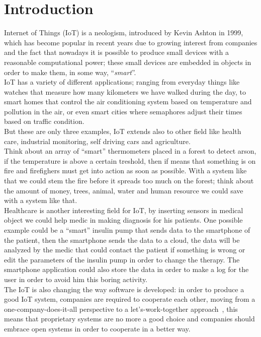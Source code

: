 	\chapter{Introduction}
	Internet of Things (IoT) is a neologism, introduced by Kevin Ashton in 1999, which has become popular in recent years due to
	growing interest from companies and the fact that nowadays it is possible to produce small devices with a reasonable computational power;
	these small devices are embedded in objects in order to make them, in some way, ``\emph{smart}''.\\
	
	IoT has a variety of different applications; ranging from everyday things like watches that measure how many kilometers we have walked during the day, to smart homes that control the air conditioning system based on temperature and pollution in the air, or even smart cities where semaphores adjust their times based on traffic condition.\\
	But these are only three examples, IoT extends also to other field like health care, industrial monitoring, self driving cars and agriculture.\\
	
	Think about an array of ``smart'' thermometers placed in a forest to detect arson, if the temperature is above
	a certain treshold, then if means that something is on fire and firefighers must get into action as soon as possible.
	With a system like that we could stem the fire before it spreads too much on the forest; think about the amount of money,
	trees, animal, water and human resource we could save with a system like that.\\
	
	Healthcare is another interesting field for IoT, by inserting sensors in medical object we could help medic
	in making diagnosis for his patients.
	One possible example could be a ``smart'' insulin pump that sends data to the smartphone of the patient, then the smartphone sends the data to a cloud, the data will be analyzed by the medic that could contact the patient if something
	is wrong or edit the parameters of the insulin pump in order to change the therapy.
	The smartphone application could also store the data in order to make a log for the user in order to avoid him
	this boring activity.\\
	
	
	The IoT is also changing the way software is developed: in order to produce a good IoT system, companies are required to cooperate each other,
	moving from a one-company-does-it-all perspective to a let’s-work-together approach~\cite{successiot}, this means that proprietary systems 
	are no more a good choice and companies should embrace open systems in order to cooperate in a better way.\\
	
